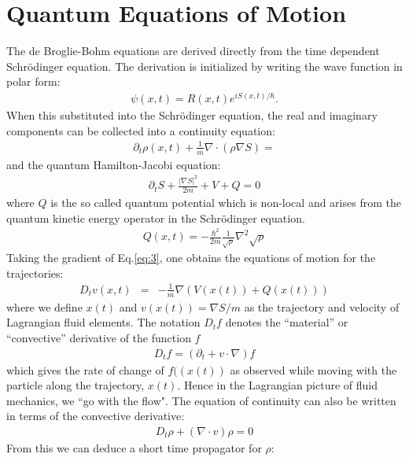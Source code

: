 \section{Quantum Equations of Motion}
The de Broglie-Bohm equations are derived directly from the time 
dependent Schr\"odinger equation.  The derivation is 
initialized by writing the wave function in polar form:
\begin{eqnarray}
  \psi (x,t) =R(x,t) e^{i S(x,t)/\hbar}.\label{eq:1}
\end{eqnarray}
When this substituted into the Schr\"odinger equation, the real and 
imaginary components can be collected into a continuity equation:
\begin{eqnarray}
    \partial_t \rho(x,t)+\frac{1}{m}\nabla \cdot( \rho\nabla S)  =
    \label{eq:2}
\end{eqnarray}
and the quantum Hamilton-Jacobi equation:
\begin{eqnarray}
   \partial_t S  + \frac{|\nabla S|^2}{2m} + V + Q = 0\label{eq:3}
\end{eqnarray}
where $Q$ is the so called quantum potential which is non-local and 
arises from the quantum kinetic energy operator in the Schr\"odinger 
equation.
\begin{eqnarray}
Q(x,t) = -\frac{{{\hbar }^2}}{2 m}\frac{1}{{\sqrt{\rho}}}{{\nabla }^2}{\sqrt{\rho}}\label{eq:4}
\end{eqnarray}
Taking the gradient of Eq.\ref{eq:3}, one obtains the equations of motion for the trajectories:
\begin{eqnarray}
{D_t}v(x,t)&=&-\frac{1}{m}\nabla (V(x(t)) + Q(x(t)))\label{eq:5}
\end{eqnarray}
where we define $x(t)$ and $v(x(t)) = \nabla S/m$ as the trajectory 
and velocity of Lagrangian fluid elements.  The notation $D_t f$ 
denotes the ``material'' or ``convective'' derivative of the function 
$f$ 
\begin{eqnarray}
    {D_t}f=\left(\partial_t+v\cdot \nabla \right)f
    \label{eq:5a}
\end{eqnarray}
which gives the rate of change of $f((x(t))$ as observed while 
moving with the particle along the trajectory, 
$x(t)$.\cite{ref20,ref21} Hence in the Lagrangian picture of fluid 
mechanics, we ``go with the flow".  The equation of continuity can also 
be written in terms of the convective derivative:
\begin{eqnarray}
{D_t}\rho  + (\nabla \cdot v) \rho  = 0\label{eq:6}
\end{eqnarray}
From this we can deduce a short time propagator for $\rho$:

